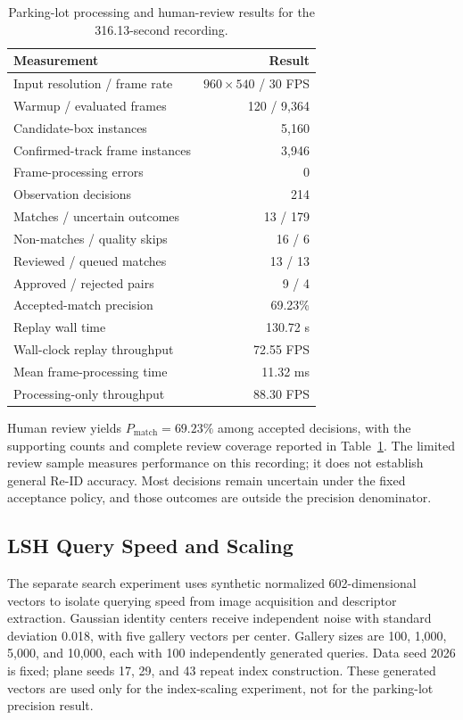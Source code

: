 \documentclass[conference]{IEEEtran}
\begin{document}
\begin{table}[t]
\centering\small
\caption{Parking-lot processing and human-review results for the 316.13-second recording.}
\label{tab:parking}
\begin{tabular}{lr}
\toprule Measurement & Result\\\midrule
Input resolution / frame rate & $960\times540$ / 30 FPS\\
Warmup / evaluated frames & 120 / 9,364\\
Candidate-box instances & 5,160\\
Confirmed-track frame instances & 3,946\\
Frame-processing errors & 0\\
Observation decisions & 214\\
Matches / uncertain outcomes & 13 / 179\\
Non-matches / quality skips & 16 / 6\\\midrule
Reviewed / queued matches & 13 / 13\\
Approved / rejected pairs & 9 / 4\\
Accepted-match precision & 69.23\%\\\midrule
Replay wall time & 130.72 s\\
Wall-clock replay throughput & 72.55 FPS\\
Mean frame-processing time & 11.32 ms\\
Processing-only throughput & 88.30 FPS\\\bottomrule
\end{tabular}
\end{table}

Human review yields $P_{\mathrm{match}}=69.23\%$ among accepted decisions, with the supporting counts and complete review coverage reported in Table~\ref{tab:parking}. The limited review sample measures performance on this recording; it does not establish general Re-ID accuracy. Most decisions remain uncertain under the fixed acceptance policy, and those outcomes are outside the precision denominator.

\subsection{LSH Query Speed and Scaling}
The separate search experiment uses synthetic normalized 602-dimensional vectors to isolate querying speed from image acquisition and descriptor extraction. Gaussian identity centers receive independent noise with standard deviation 0.018, with five gallery vectors per center. Gallery sizes are 100, 1,000, 5,000, and 10,000, each with 100 independently generated queries. Data seed 2026 is fixed; plane seeds 17, 29, and 43 repeat index construction. These generated vectors are used only for the index-scaling experiment, not for the parking-lot precision result.
\end{document}
